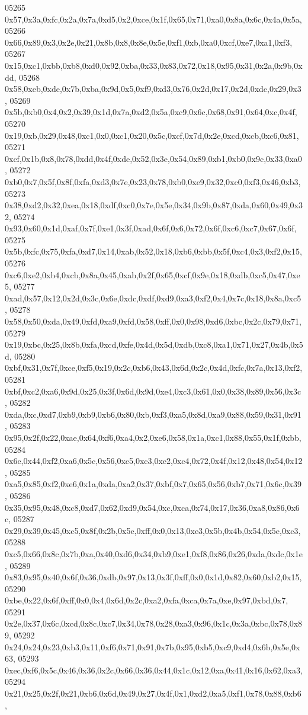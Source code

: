 \begin{DoxyCode}
05265   0x57,0x3a,0xfc,0x2a,0x7a,0xd5,0x2,0xce,0x1f,0x65,0x71,0xa0,0x8a,0x6c,0x4a,0x5a,
05266   0x66,0x89,0x3,0x2e,0x21,0x8b,0x8,0x8e,0x5e,0xf1,0xb,0xa0,0xcf,0xe7,0xa1,0xf3,
05267   0x15,0xc1,0xbb,0xb8,0xd0,0x92,0xba,0x33,0x83,0x72,0x18,0x95,0x31,0x2a,0x9b,0xdd,
05268   0x58,0xeb,0xde,0x7b,0xba,0x9d,0x5,0xf9,0xd3,0x76,0x2d,0x17,0x2d,0xdc,0x29,0x3,
05269   0x5b,0xb0,0x4,0x2,0x39,0x1d,0x7a,0xd2,0x5a,0xc9,0x6c,0x68,0x91,0x64,0xc,0x4f,
05270   0x19,0xb,0x29,0x48,0xc1,0x0,0xc1,0x20,0x5c,0xcf,0x7d,0x2e,0xcd,0xcb,0xc6,0x81,
05271   0xcf,0x1b,0x8,0x78,0xdd,0x4f,0xde,0x52,0x3e,0x54,0x89,0xb1,0xb0,0x9c,0x33,0xa0,
05272   0xb0,0x7,0x5f,0x8f,0xfa,0xd3,0x7e,0x23,0x78,0xb0,0xe9,0x32,0xc0,0xf3,0x46,0xb3,
05273   0x38,0xd2,0x32,0xea,0x18,0xdf,0xc0,0x7e,0x5e,0x34,0x9b,0x87,0xda,0x60,0x49,0x32,
05274   0x93,0x60,0x1d,0xaf,0x7f,0xe1,0x3f,0xad,0x6f,0x6,0x72,0x6f,0xc6,0xc7,0x67,0x6f,
05275   0x5b,0xfc,0x75,0xfa,0xd7,0x14,0xab,0x52,0x18,0xb6,0xbb,0x5f,0xc4,0x3,0xf2,0x15,
05276   0xc6,0xe2,0xb4,0xcb,0x8a,0x45,0xab,0x2f,0x65,0xcf,0x9e,0x18,0xdb,0xc5,0x47,0xe5,
05277   0xad,0x57,0x12,0x2d,0x3c,0x6e,0xdc,0xdf,0xd9,0xa3,0xf2,0x4,0x7c,0x18,0x8a,0xc5,
05278   0x58,0x50,0xda,0x49,0xfd,0xa9,0xfd,0x58,0xff,0x0,0x98,0xd6,0xbc,0x2c,0x79,0x71,
05279   0x19,0xbc,0x25,0x8b,0xfa,0xcd,0xfe,0x4d,0x5d,0xdb,0xc8,0xa1,0x71,0x27,0x4b,0x5d,
05280   0xbf,0x31,0x7f,0xce,0xf5,0x19,0x2c,0xb6,0x43,0x6d,0x2c,0x4d,0xfc,0x7a,0x13,0xf2,
05281   0xbf,0xc2,0xa6,0x9d,0x25,0x3f,0x6d,0x9d,0xe4,0xc3,0x61,0x0,0x38,0x89,0x56,0x3c,
05282   0xda,0xc,0xd7,0xb9,0xb9,0xb6,0x80,0xb,0xf3,0xa5,0x8d,0xa9,0x88,0x59,0x31,0x91,
05283   0x95,0x2f,0x22,0xae,0x64,0xf6,0xa4,0x2,0xe6,0x58,0x1a,0xc1,0x88,0x55,0x1f,0xbb,
05284   0x6e,0x44,0xf2,0xa6,0x5c,0x56,0xc5,0xc3,0xe2,0xc4,0x72,0x4f,0x12,0x48,0x54,0x12,
05285   0xa5,0x85,0xf2,0xe6,0x1a,0xda,0xa2,0x37,0xbf,0x7,0x65,0x56,0xb7,0x71,0x6c,0x39,
05286   0x35,0x95,0x48,0xc8,0xd7,0x62,0xd9,0x54,0xc,0xca,0x74,0x17,0x36,0xa8,0x86,0x6c,
05287   0x29,0x39,0x45,0xc5,0x8f,0x2b,0x5e,0xff,0x0,0x13,0xe3,0x5b,0x4b,0x54,0x5e,0xc3,
05288   0xc5,0x66,0x8c,0x7b,0xa,0x40,0xd6,0x34,0xb9,0xe1,0xf8,0x86,0x26,0xda,0xdc,0x1e,
05289   0x83,0x95,0x40,0x6f,0x36,0xdb,0x97,0x13,0x3f,0xff,0x0,0x1d,0x82,0x60,0xb2,0x15,
05290   0xbe,0x22,0x6f,0xff,0x0,0x4,0x6d,0x2c,0xa2,0xfa,0xca,0x7a,0xe,0x97,0xbd,0x7,
05291   0x2e,0x37,0x6c,0xcd,0x8c,0xc7,0x34,0x78,0x28,0xa3,0x96,0x1c,0x3a,0xbc,0x78,0x89,
05292   0x24,0x24,0x23,0xb3,0x11,0xf6,0x71,0x91,0x7b,0x95,0xb5,0xc9,0xd4,0x6b,0x5e,0x63,
05293   0xec,0xf6,0x5c,0x46,0x36,0x2c,0x66,0x36,0x44,0x1c,0x12,0xa,0x41,0x16,0x62,0xa3,
05294   0x21,0x25,0x2f,0x21,0xb6,0x6d,0x49,0x27,0x4f,0x1,0xd2,0xa5,0xf1,0x78,0x88,0xb6,

\end{DoxyCode}
